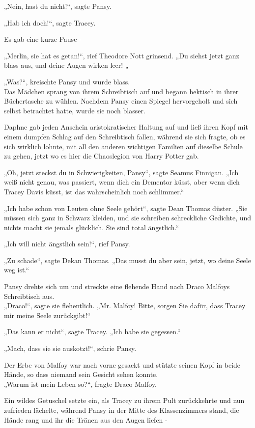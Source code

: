 {„Nein, hast du nicht!“, sagte Pansy.

„Hab ich doch!“, sagte Tracey.

Es gab eine kurze Pause -

„Merlin, sie hat es getan!“, rief Theodore Nott grinsend. „Du siehst jetzt ganz blass aus, und deine Augen wirken leer! „

„Was?“, kreischte Pansy und wurde blass.\\ Das Mädchen sprang von ihrem Schreibtisch auf und begann hektisch in ihrer Büchertasche zu wühlen. Nachdem Pansy einen Spiegel hervorgeholt und sich selbst betrachtet hatte, wurde sie noch blasser.

Daphne gab jeden Anschein aristokratischer Haltung auf und ließ ihren Kopf mit einem dumpfen Schlag auf den Schreibtisch fallen, während sie sich fragte, ob es sich wirklich lohnte, mit all den anderen wichtigen Familien auf dieselbe Schule zu gehen, jetzt wo es hier die Chaoslegion von Harry Potter gab.

„Oh, jetzt steckst du in Schwierigkeiten, Pansy“, sagte Seamus Finnigan. „Ich weiß nicht genau, was passiert, wenn dich ein Dementor küsst, aber wenn dich Tracey Davis küsst, ist das wahrscheinlich noch schlimmer.“

„Ich habe schon von Leuten ohne Seele gehört“, sagte Dean Thomas düster. „Sie müssen sich ganz in Schwarz kleiden, und sie schreiben schreckliche Gedichte, und nichts macht sie jemals glücklich. Sie sind total ängstlich.“

„Ich will nicht ängstlich sein!“, rief Pansy.

„Zu schade“, sagte Dekan Thomas. „Das musst du aber sein, jetzt, wo deine Seele weg ist.“

Pansy drehte sich um und streckte eine flehende Hand nach Draco Malfoys Schreibtisch aus.\\ „Draco!“, sagte sie flehentlich. „Mr. Malfoy! Bitte, sorgen Sie dafür, dass Tracey mir meine Seele zurückgibt!“

„Das kann er nicht“, sagte Tracey. „Ich habe sie gegessen.“

„Mach, dass sie sie auskotzt!“, schrie Pansy.

Der Erbe von Malfoy war nach vorne gesackt und stützte seinen Kopf in beide Hände, so dass niemand sein Gesicht sehen konnte.\\ „Warum ist mein Leben so?“, fragte Draco Malfoy.

Ein wildes Getuschel setzte ein, als Tracey zu ihrem Pult zurückkehrte und nun zufrieden lächelte, während Pansy in der Mitte des Klassenzimmers stand, die Hände rang und ihr die Tränen aus den Augen liefen -

}
